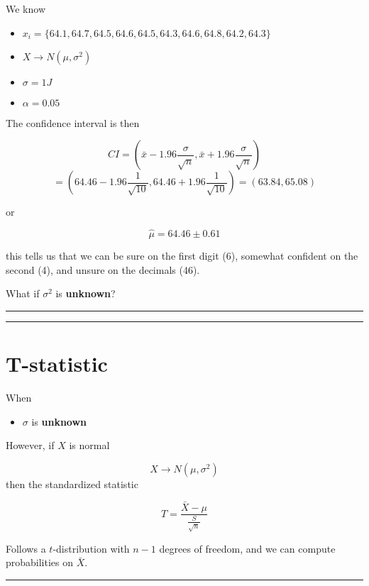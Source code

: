 \documentclass[
]{book}
\providecommand{\tightlist}{%
  \setlength{\itemsep}{0pt}\setlength{\parskip}{0pt}}
\begin{document}
We know

\begin{itemize}
\tightlist
\item
  \(x_i=\{64.1, 64.7, 64.5, 64.6, 64.5, 64.3, 64.6, 64.8, 64.2, 64.3\}\)
\item
  \(X \rightarrow N(\mu, \sigma^2)\)
\item
  \(\sigma=1J\)
\item
  \(\alpha=0.05\)
\end{itemize}

The confidence interval is then

\[CI=(\bar{x}-1.96 \frac{\sigma}{\sqrt{n}}, \bar{x}+1.96  \frac{\sigma}{\sqrt{n}})\]
\[=(64.46-1.96 \frac{1}{\sqrt{10}}, 64.46+1.96  \frac{1}{\sqrt{10}})=(63.84,65.08)\]

or

\[\hat{\mu}=64.46 \pm 0.61\]

this tells us that we can be sure on the first digit (6), somewhat confident on the second (4), and unsure on the decimals (46).

What if \(\sigma^2\) is \textbf{unknown}?

\begin{center}\rule{0.5\linewidth}{0.5pt}\end{center}

\begin{center}\rule{0.5\linewidth}{0.5pt}\end{center}

\hypertarget{t-statistic-3}{%
\section{T-statistic}\label{t-statistic-3}}

When

\begin{itemize}
\tightlist
\item
  \(\sigma\) is \textbf{unknown}
\end{itemize}

However, if \(X\) is normal

\[X \rightarrow N(\mu, \sigma^2)\] then the standardized statistic

\[T=\frac{\bar{X}-\mu}{\frac{S}{\sqrt{n}}}\]

Follows a \(t\)-distribution with \(n-1\) degrees of freedom, and we can compute probabilities on \(\bar{X}\).

\begin{center}\rule{0.5\linewidth}{0.5pt}\end{center}
\end{document}
